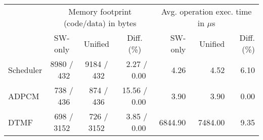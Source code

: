 
\begin{tabular}{|l|ccc|rrr|}
\cline{2-7}
\multicolumn{1}{c}{}  &   \multicolumn{3}{|c|}{Memory footprint (code/data) in bytes}    & \multicolumn{3}{|c|}{Avg. operation exec. time in $\mu$s} \\
\multicolumn{1}{c|}{} &   SW-only    &   Unified     &       Diff. (\%)                  & SW-only   &  Unified   &     Diff. (\%) \\
\cline{1-1}
Scheduler             &  8980 / ~432 &   9184 / ~432 &  ~2.27 / ~~0.00                   & ~~~4.26   &   ~~~~4.52 & ~6.10\\
ADPCM                 &  ~738 / ~436 &   ~874 / ~436 &  15.56 / ~~0.00                   & ~~~3.90   &   ~~~~3.90 & ~0.00\\
DTMF                  &  ~698 / 3152 &   ~726 / 3152 &  ~3.85 / ~~0.00                   & 6844.90   &   7484.00  & ~9.35\\
\hline

\end{tabular}





